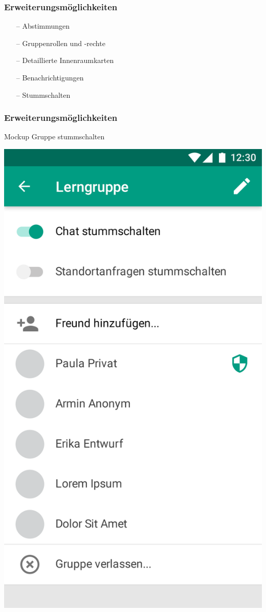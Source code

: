 \documentclass[aspectratio=1610]{beamer}
\begin{document}
  \begin{frame}[plain]
      \frametitle{\textbf{Erweiterungsmöglichkeiten}}
        \begin{itemize}
          \item[--] Abstimmungen
          \item[--] Gruppenrollen und -rechte
          \item[--] Detaillierte Innenraumkarten
          \item[--] Benachrichtigungen
          \item[--] Stummschalten
        \end{itemize}
  \end{frame}
  
  
  \begin{frame}[plain]
      \frametitle{\textbf{Erweiterungsmöglichkeiten}}
        \begin{minipage}{0.45\textwidth}
			Mockup Gruppe stummschalten
		\end{minipage}	
		\begin{minipage}{0.45\textwidth}
			\includegraphics[height = \paperheight - 50pt]{images/gui-mockups/group_members.png}

\end{minipage}
\end{frame}
\end{document}
